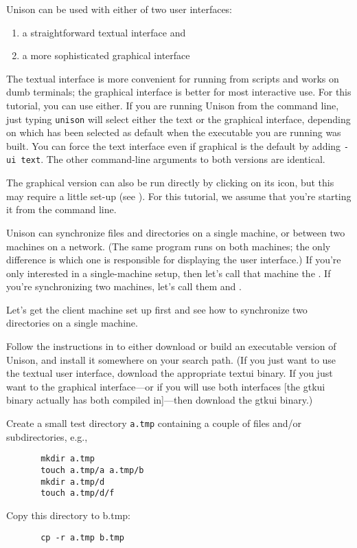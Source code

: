 \documentclass{article}
\begin{document}
Unison can be used with either of two user interfaces:
\begin{enumerate}
\item a straightforward textual interface and
\item a more sophisticated graphical interface
\end{enumerate}
The textual interface is more convenient for running from scripts and
works on dumb terminals; the graphical interface is better for most
interactive use.  For this tutorial, you can use either.  If you are running
Unison from the command line, just typing {\tt unison}
will select either the text or the graphical interface, depending on which
has been selected as default when the executable you are running was
built.  You can force the text interface even if graphical is the default by
adding {\tt -ui text}.
The other command-line arguments to both versions are identical.

The graphical version can also be run directly by clicking on its icon, but
this may require a little set-up (see ).  For this tutorial, we assume that you're starting it from the
command line.

Unison can synchronize files and directories on a single machine, or
between two machines on a network.  (The same program runs on both
machines; the only difference is which one is responsible for
displaying the user interface.)  If you're only interested in a
single-machine setup, then let's call that machine the \CLIENT{}.  If
you're synchronizing two machines, let's call them \CLIENT{} and
\SERVER.


Let's get the client machine set up first and see how to synchronize
two directories on a single machine.

Follow the instructions in  to either
download or build an executable version of Unison, and install it
somewhere on your search path.  (If you just want to use the textual user
interface, download the appropriate textui binary.  If you just want to
the graphical interface---or if you will use both interfaces [the gtkui
binary actually has both compiled in]---then download the gtkui binary.)

Create a small test directory {\tt a.tmp} containing a couple of files
and/or subdirectories, e.g.,
\begin{verbatim}
       mkdir a.tmp
       touch a.tmp/a a.tmp/b
       mkdir a.tmp/d
       touch a.tmp/d/f
\end{verbatim}
Copy this directory to b.tmp:
\begin{verbatim}
       cp -r a.tmp b.tmp
\end{verbatim}
\end{document}
